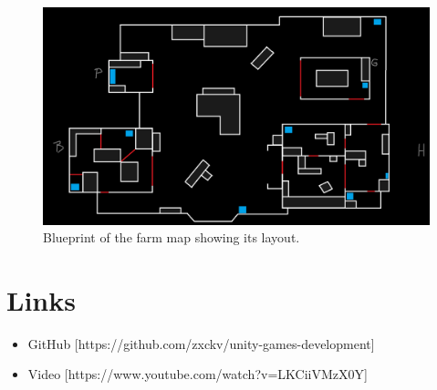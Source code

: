 \documentclass[11pt]{article}
\begin{document}
\begin{figure}[htb] 
    \centering
    \includegraphics[width=\columnwidth]{farm-bp}
    \caption{Blueprint of the farm map showing its layout.}
    \label{fig:farm-bp}
\end{figure}

\clearpage


\section{Links}
\begin{itemize}
    \item GitHub [https://github.com/zxckv/unity-games-development]
    \item Video [https://www.youtube.com/watch?v=LKCiiVMzX0Y]
\end{itemize}

\clearpage
\end{document}
